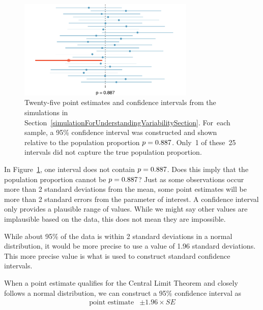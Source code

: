 \begin{figure}
   \centering
   \includegraphics[width=0.75\textwidth]{ch_inference_for_props/figures/95PercentConfidenceInterval/95PercentConfidenceInterval}
   \caption{Twenty-five point estimates and confidence
       intervals from the simulations in
       Section~\ref{simulationForUnderstandingVariabilitySection}.
       For~each sample, a 95\% confidence interval was
       constructed and shown relative to the population
       proportion $p = 0.887{}$. Only~1 of these~25
       intervals did not capture the true population
       proportion.}
   \label{95PercentConfidenceInterval}
\end{figure}

\begin{example}{In Figure~\ref{95PercentConfidenceInterval},
one interval does not contain $p = 0.887{}$.
Does this imply that the population proportion cannot be
$p = 0.887{}$?}
Just as some observations occur more than 2 standard deviations
from the mean, some point estimates will be more than
2 standard errors from the parameter of interest.
A confidence interval only provides a plausible range
of values. While we might say other values are implausible
based on the data, this does not mean they are impossible.
\end{example}

While about 95\% of the data is within 2 standard deviations
in a normal distribution, it would be more precise to use
a value of 1.96 standard deviations. This more precise value
is what is used to construct standard confidence intervals.

\begin{termBox}{
  When a point estimate qualifies for the Central Limit
  Theorem and closely follows a normal distribution,
  we can construct a 95\% confidence interval as
  \begin{align*}
  \text{point estimate} &\pm 1.96 \times SE
  \end{align*}}
\end{termBox}

